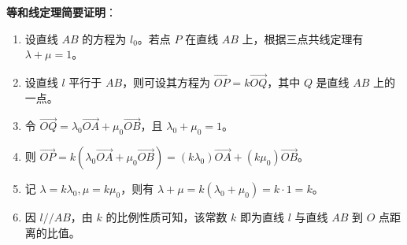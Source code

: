 \begin{proofbox}
\textbf{等和线定理简要证明}：
\begin{enumerate}
    \item 设直线 $AB$ 的方程为 $l_0$。若点 $P$ 在直线 $AB$ 上，根据三点共线定理有 $\lambda + \mu = 1$。
    \item 设直线 $l$ 平行于 $AB$，则可设其方程为 $\vec{OP} = k \vec{OQ}$，其中 $Q$ 是直线 $AB$ 上的一点。
    \item 令 $\vec{OQ} = \lambda_0 \vec{OA} + \mu_0 \vec{OB}$，且 $\lambda_0 + \mu_0 = 1$。
    \item 则 $\vec{OP} = k(\lambda_0 \vec{OA} + \mu_0 \vec{OB}) = (k\lambda_0)\vec{OA} + (k\mu_0)\vec{OB}$。
    \item 记 $\lambda = k\lambda_0, \mu = k\mu_0$，则有 $\lambda + \mu = k(\lambda_0 + \mu_0) = k \cdot 1 = k$。
    \item 因 $l // AB$，由 $k$ 的比例性质可知，该常数 $k$ 即为直线 $l$ 与直线 $AB$ 到 $O$ 点距离的比值。
\end{enumerate}
\end{proofbox}